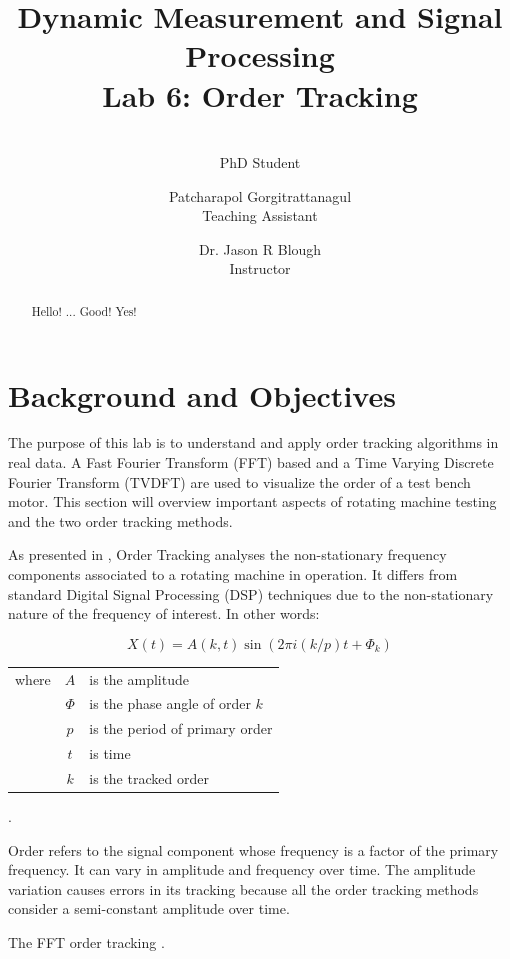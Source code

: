 \documentclass[10pt,letterpaper,twocolumn]{article}
\author{\makebox[.9\textwidth]{Guilherme Aramizo Ribeiro}\\PhD Student 
\and Patcharapol Gorgitrattanagul \\Teaching Assistant \and Dr. Jason R Blough\\Instructor}
\title{Dynamic Measurement and Signal Processing \\Lab 6: Order Tracking}
\begin{document}
\maketitle

\begin{abstract}
    Hello! ...
    Good!
	Yes!
    
\end{abstract}

\section{Background and Objectives}

	The purpose of this lab is to understand and apply order tracking algorithms in real data. A Fast Fourier Transform (FFT) based and a Time Varying Discrete Fourier Transform (TVDFT) are used to visualize the order of a test bench motor. This section will overview important aspects of rotating machine testing and the two order tracking methods.
	
	As presented in \cite{blough1}, Order Tracking analyses the non-stationary frequency components associated to a rotating machine in operation. It differs from standard Digital Signal Processing (DSP) techniques due to the non-stationary nature of the frequency of interest. In other words:
	
	\begin{equation}
	X(t) = A(k,t)\sin(2 \pi i (k/p) t + \Phi _k)
	\end{equation}	 

	\begin{tabular}{r c m{5 cm}}
	where & $ A $ & is the amplitude \\ 
	 & $ \Phi $ & is the phase angle of order $ k $ \\ 
	 & $ p $ & is the period of primary order \\ 
	 & $ t $ & is time \\ 
	 & $ k $ & is the tracked order \\ 
	\end{tabular} 
	.
	
	Order refers to the signal component whose frequency is a factor of the primary frequency. It can vary in amplitude and frequency over time. The amplitude variation causes errors in its tracking because all the order tracking methods consider a semi-constant amplitude over time.
	
	The FFT order tracking .
	
\end{document}
